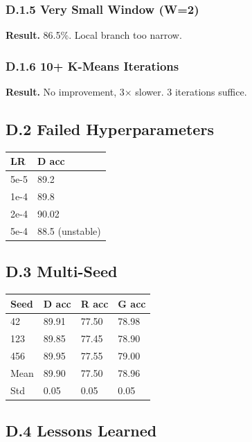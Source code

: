 \subsubsection{D.1.5 Very Small Window (W=2)}

\textbf{Result.} 86.5\%. Local branch too narrow.

\subsubsection{D.1.6 10+ K-Means Iterations}

\textbf{Result.} No improvement, 3$\times$ slower. 3 iterations suffice.

\subsection{D.2 Failed Hyperparameters}

\begin{table}[H]
\centering
\small
\begin{tabular}{ll}
\toprule
\textbf{LR} & \textbf{D acc} \\
\midrule
5e-5 & 89.2 \\
1e-4 & 89.8 \\
2e-4 & 90.02 \\
5e-4 & 88.5 (unstable) \\
\bottomrule
\end{tabular}
\end{table}

\subsection{D.3 Multi-Seed}

\begin{table}[H]
\centering
\small
\begin{tabular}{llll}
\toprule
\textbf{Seed} & \textbf{D acc} & \textbf{R acc} & \textbf{G acc} \\
\midrule
42 & 89.91 & 77.50 & 78.98 \\
123 & 89.85 & 77.45 & 78.90 \\
456 & 89.95 & 77.55 & 79.00 \\
Mean & 89.90 & 77.50 & 78.96 \\
Std & 0.05 & 0.05 & 0.05 \\
\bottomrule
\end{tabular}
\end{table}

\subsection{D.4 Lessons Learned}

